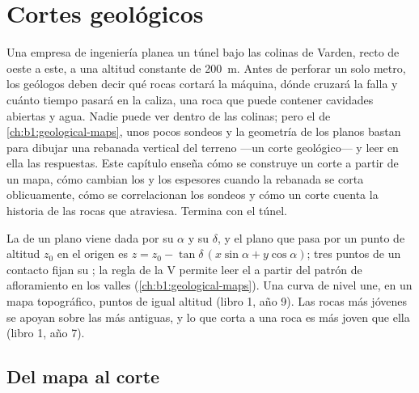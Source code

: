 \chapter{Cortes geológicos}\label{ch:b1:cross-sections}

Una empresa de ingeniería planea un túnel bajo las colinas de Varden, recto de oeste a este, a una
altitud constante de \qty{200}{m}. Antes de perforar un solo metro, los geólogos deben decir qué
rocas cortará la máquina, dónde cruzará la falla y cuánto tiempo pasará en la caliza, una roca que
puede contener cavidades abiertas y agua. Nadie puede ver dentro de las colinas; pero el  de \cref{ch:b1:geological-maps}, unos pocos sondeos y la geometría de los planos bastan
para dibujar una rebanada vertical del terreno ---un corte geológico--- y leer en ella las
respuestas. Este capítulo enseña cómo se construye un corte a partir de un mapa, cómo cambian los
 y los espesores cuando la rebanada se corta oblicuamente, cómo se correlacionan los
sondeos y cómo un corte cuenta la historia de las rocas que atraviesa. Termina con el túnel.

\begin{recall}
La  de un plano viene dada por su  $\alpha$ y su 
$\delta$, y el plano que pasa por un punto de altitud $z_0$ en el origen es
$z = z_0 - \tan\delta\,(x\sin\alpha + y\cos\alpha)$; tres puntos de un contacto fijan su ;
la regla de la V permite leer el  a partir del patrón de afloramiento en los valles
(\cref{ch:b1:geological-maps}). Una curva de nivel une, en un mapa topográfico, puntos de igual
altitud (libro 1, año 9). Las rocas más jóvenes se apoyan sobre las más antiguas, y lo que corta a
una roca es más joven que ella (libro 1, año 7).
\end{recall}

\section{Del mapa al corte}

